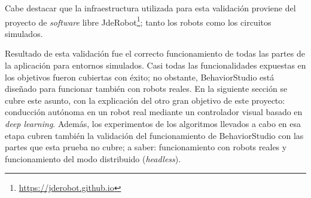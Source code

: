 Cabe destacar que la infraestructura utilizada para esta validación proviene del proyecto de \textit{software} libre JdeRobot\footnote{\url{https://jderobot.github.io}}; tanto los robots como los circuitos simulados.

Resultado de esta validación fue el correcto funcionamiento de todas las partes de la aplicación para entornos simulados. Casi todas las funcionalidades expuestas en los objetivos fueron cubiertas con éxito; no obstante, BehaviorStudio está diseñado para funcionar también con robots reales. En la siguiente sección se cubre este asunto, con la explicación del otro gran objetivo de este proyecto: conducción autónoma en un robot real mediante un controlador visual basado en \textit{deep learning}. Además, los experimentos de los algoritmos llevados a cabo en esa etapa cubren también la validación del funcionamiento de BehaviorStudio con las partes que esta prueba no cubre; a saber: funcionamiento con robots reales y funcionamiento del modo distribuido (\textit{headless}).
